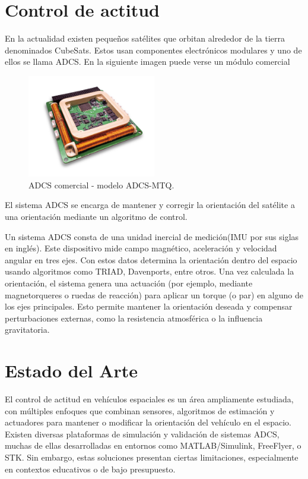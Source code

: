 \section{Control de actitud}
En la actualidad existen pequeños satélites que orbitan alrededor de la tierra denominados CubeSats. Estos usan componentes electrónicos modulares y uno de ellos se llama ADCS. En la siguiente imagen puede verse un módulo comercial 
	\begin{figure}[htbp]
	\centering
	\includegraphics[width=0.5\textwidth]{./Figures/ADCS-Commercial.jpg}
	\caption{ADCS comercial - modelo ADCS-MTQ.}
	\label{fig:adcs_commercial}
\end{figure}


El sistema ADCS se encarga de mantener y corregir  la orientación del satélite a una orientación mediante un algoritmo de control. 

Un sistema ADCS consta de una unidad inercial de medición(IMU por sus siglas en inglés). Este dispositivo mide campo magnético, aceleración y velocidad angular en tres ejes. 
Con estos datos  determina la orientación dentro del espacio usando algoritmos como TRIAD, Davenports, entre otros.
Una vez calculada la orientación, el sistema genera una actuación (por ejemplo, mediante magnetorqueres o ruedas de reacción) para aplicar un torque (o par) en alguno de los ejes principales. Esto permite mantener la orientación deseada y compensar perturbaciones externas, como la resistencia atmosférica o la influencia gravitatoria. 


\section{Estado del Arte}

El control de actitud en vehículos espaciales es un área ampliamente estudiada, con múltiples enfoques que combinan sensores, algoritmos de estimación y actuadores para mantener o modificar la orientación del vehículo en el espacio. Existen diversas plataformas de simulación y validación de sistemas ADCS, muchas de ellas desarrolladas en entornos como MATLAB/Simulink, FreeFlyer, o STK. Sin embargo, estas soluciones presentan ciertas limitaciones, especialmente en contextos educativos o de bajo presupuesto.

